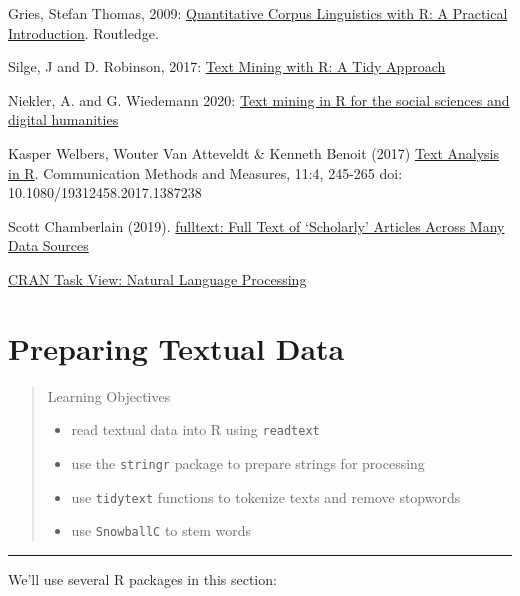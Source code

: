 \documentclass[
]{book}
\providecommand{\tightlist}{%
  \setlength{\itemsep}{0pt}\setlength{\parskip}{0pt}}
\begin{document}
Gries, Stefan Thomas, 2009: \href{http://www.stgries.info/research/qclwr/qclwr.html}{Quantitative Corpus Linguistics with R: A Practical Introduction}. Routledge.

Silge, J and D. Robinson, 2017: \href{http://tidytextmining.com/}{Text Mining with R: A Tidy Approach}

Niekler, A. and G. Wiedemann 2020: \href{https://tm4ss.github.io/docs/index.html}{Text mining in R for the social sciences and digital humanities}

Kasper Welbers, Wouter Van Atteveldt \& Kenneth Benoit (2017) \href{https://doi.org/10.1080/19312458.2017.1387238}{Text Analysis in R}. Communication Methods and Measures, 11:4, 245-265 doi: 10.1080/19312458.2017.1387238

Scott Chamberlain (2019). \href{https://books.ropensci.org/fulltext/}{fulltext: Full Text of `Scholarly' Articles Across Many Data Sources}

\href{https://CRAN.R-project.org/view=NaturalLanguageProcessing}{CRAN Task View: Natural Language Processing}

\hypertarget{textprep}{%
\chapter{Preparing Textual Data}\label{textprep}}

\begin{quote}
Learning Objectives

\begin{itemize}
\tightlist
\item
  read textual data into R using \texttt{readtext}
\item
  use the \texttt{stringr} package to prepare strings for processing
\item
  use \texttt{tidytext} functions to tokenize texts and remove stopwords
\item
  use \texttt{SnowballC} to stem words
\end{itemize}
\end{quote}

\begin{center}\rule{0.5\linewidth}{0.5pt}\end{center}

We'll use several R packages in this section:
\end{document}
